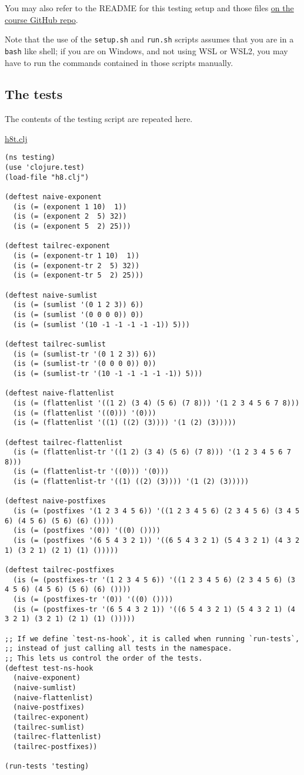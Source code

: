 \documentclass[11pt]{article}
\begin{document}
You may also refer to the README
for this testing setup and those files
\href{https://github.com/armkeh/principles-of-programming-languages/tree/master/homework/testing/h5}{on the course GitHub repo}.

Note that the use of the \texttt{setup.sh} and \texttt{run.sh} scripts assumes
that you are in a \texttt{bash} like shell; if you are on Windows,
and not using WSL or WSL2, you may have
to run the commands contained in those scripts manually.

\subsection*{The tests}
\label{sec:org37e50f0}
The contents of the testing script are repeated here.

\href{./testing/h8/h8t.clj}{h8t.clj}
\begin{verbatim}
(ns testing)
(use 'clojure.test)
(load-file "h8.clj")

(deftest naive-exponent
  (is (= (exponent 1 10)  1))
  (is (= (exponent 2  5) 32))
  (is (= (exponent 5  2) 25)))

(deftest tailrec-exponent
  (is (= (exponent-tr 1 10)  1))
  (is (= (exponent-tr 2  5) 32))
  (is (= (exponent-tr 5  2) 25)))

(deftest naive-sumlist
  (is (= (sumlist '(0 1 2 3)) 6))
  (is (= (sumlist '(0 0 0 0)) 0))
  (is (= (sumlist '(10 -1 -1 -1 -1 -1)) 5)))

(deftest tailrec-sumlist
  (is (= (sumlist-tr '(0 1 2 3)) 6))
  (is (= (sumlist-tr '(0 0 0 0)) 0))
  (is (= (sumlist-tr '(10 -1 -1 -1 -1 -1)) 5)))

(deftest naive-flattenlist
  (is (= (flattenlist '((1 2) (3 4) (5 6) (7 8))) '(1 2 3 4 5 6 7 8)))
  (is (= (flattenlist '((0))) '(0)))
  (is (= (flattenlist '((1) ((2) (3)))) '(1 (2) (3)))))

(deftest tailrec-flattenlist
  (is (= (flattenlist-tr '((1 2) (3 4) (5 6) (7 8))) '(1 2 3 4 5 6 7 8)))
  (is (= (flattenlist-tr '((0))) '(0)))
  (is (= (flattenlist-tr '((1) ((2) (3)))) '(1 (2) (3)))))

(deftest naive-postfixes
  (is (= (postfixes '(1 2 3 4 5 6)) '((1 2 3 4 5 6) (2 3 4 5 6) (3 4 5 6) (4 5 6) (5 6) (6) ())))
  (is (= (postfixes '(0)) '((0) ())))
  (is (= (postfixes '(6 5 4 3 2 1)) '((6 5 4 3 2 1) (5 4 3 2 1) (4 3 2 1) (3 2 1) (2 1) (1) ()))))

(deftest tailrec-postfixes
  (is (= (postfixes-tr '(1 2 3 4 5 6)) '((1 2 3 4 5 6) (2 3 4 5 6) (3 4 5 6) (4 5 6) (5 6) (6) ())))
  (is (= (postfixes-tr '(0)) '((0) ())))
  (is (= (postfixes-tr '(6 5 4 3 2 1)) '((6 5 4 3 2 1) (5 4 3 2 1) (4 3 2 1) (3 2 1) (2 1) (1) ()))))

;; If we define `test-ns-hook`, it is called when running `run-tests`,
;; instead of just calling all tests in the namespace.
;; This lets us control the order of the tests.
(deftest test-ns-hook
  (naive-exponent)
  (naive-sumlist)
  (naive-flattenlist)
  (naive-postfixes)
  (tailrec-exponent)
  (tailrec-sumlist)
  (tailrec-flattenlist)
  (tailrec-postfixes))

(run-tests 'testing)
\end{verbatim}
\end{document}
